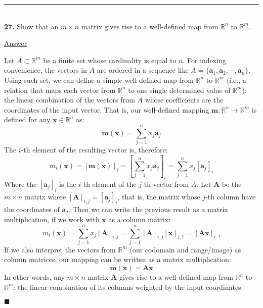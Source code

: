\documentclass{article}[10pt]
\newenvironment{exercise}[1]
    {\noindent\rule{2cm}{0.4pt} \\
     \textbf{#1.}}
    {}
\newcommand{\answer}{

  \underline{Answer}

}
\newcommand{\qed}{

\hfill\ensuremath{\blacksquare}

}
\begin{document}
\begin{exercise}{27}
  Show that an $m \times n$ matrix
  gives rise to a well-defined map
  from $\mathds{R}^n$ to $\mathds{R}^m$.
  \answer
  Let $A \subset \mathds{R}^m$
  be a finite set whose cardinality is equal to $n$.
  For indexing convenience,
  the vectors in $A$ are ordered in a sequence like
  $A = \{\mathbf{a}_1, \mathbf{a}_2, \cdots, \mathbf{a}_n\}$.
  Using such set, we can define a simple well-defined map
  from $\mathds{R}^n$ to $\mathds{R}^m$
  (i.e., a relation that maps each vector from $\mathds{R}^n$
         to one single determined value of $\mathds{R}^m$):
  the linear combination of the vectors from $A$
  whose coefficients are the coordinates of the input vector.
  That is, our well-defined mapping
  $\mathbf{m} : \mathds{R}^n \to \mathds{R}^m$
  is defined for any $\mathbf{x} \in \mathds{R}^n$ as:
  \[
    \mathbf{m}(\mathbf{x}) = \sum_{j = 1}^n x_j \mathbf{a}_j
  \]
  The $i$-th element of the resulting vector is, therefore:
  \[
    m_i(\mathbf{x})
      = \left[ \mathbf{m}(\mathbf{x}) \right]_i
      = \left[ \sum_{j = 1}^n x_j \mathbf{a}_j \right]_i
      = \sum_{j = 1}^n x_j [\mathbf{a}_j]_i
  \]
  Where the $[\mathbf{a}_j]_i$
  is the $i$-th element of the $j$-th vector from $A$.
  Let $\mathbf{A}$ be the $m \times n$ matrix
  where $[\mathbf{A}]_{i,j} = [\mathbf{a}_j]_i$, that is,
  the matrix whose $j$-th column
  have the coordinates of $\mathbf{a}_j$.
  Then we can write the previous result as a matrix multiplication,
  if we work with $\mathbf{x}$ as a column matrix:
  \[
    m_i(\mathbf{x})
      = \sum_{j = 1}^n x_j [\mathbf{A}]_{i, j}
      = \sum_{j = 1}^n [\mathbf{A}]_{i, j} [\mathbf{x}]_{j, 1}
      = [\mathbf{A} \mathbf{x}]_{i, 1}
  \]
  If we also interpret the vectors from $\mathds{R}^m$
  (our codomain and range/image)
  as column matrices,
  our mapping can be written as
  a matrix multiplication:
  \[
    \mathbf{m}(\mathbf{x}) = \mathbf{A} \mathbf{x}
  \]
  In other words,
  any $m \times n$ matrix $\mathbf{A}$
  gives rise to a well-defined map
  from $\mathds{R}^n$ to $\mathds{R}^m$:
  the linear combination of its columns
  weighted by the input coordinates.
  \qed
\end{exercise}
\end{document}
